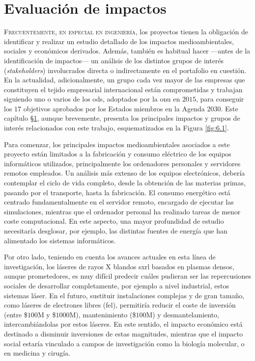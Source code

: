 \chapter{Evaluación de impactos}\label{cap:6}
\lettrine{F}{recuentemente, en especial en ingeniería}, los proyectos tienen la obligación de identificar y realizar un estudio detallado de los impactos medioambientales, sociales y económicos derivados. Además, también es habitual hacer ---antes de la identificación de impactos--- un análisis de los distintos grupos de interés (\emph{stakeholders}) involucrados directa o indirectamente en el portafolio en cuestión. En la actualidad, adicionalmente, un grupo cada vez mayor de las empresas que constituyen el tejido empresarial internacional están comprometidas y trabajan siguiendo uno o varios de los \acrfull{ods}, adoptados por la \acrfull{onu} en $2015$, para conseguir los $17$ objetivos aprobados por los Estados miembros en la Agenda $2030$. Este capítulo \S\ref{cap:6}, aunque brevemente, presenta los principales impactos y grupos de interés relacionados con este trabajo, esquematizados en la Figura \ref{fig:6.1}.

Para comenzar, los principales impactos medioambientales asociados a este proyecto están limitados a la fabricación y consumo eléctrico de los equipos informáticos utilizados, principalmente los ordenadores personales y servidores remotos empleados. Un análisis más extenso de los equipos electrónicos, debería contemplar el ciclo de vida completo, desde la obtención de las materias primas, pasando por el transporte, hasta la fabricación. El consumo energético está centrado fundamentalmente en el servidor remoto, encargado de ejecutar las simulaciones, mientras que el ordenador personal ha realizado tareas de menor coste computacional. En este aspecto, una mayor profundidad de estudio necesitaría desglosar, por ejemplo, las distintas fuentes de energía que han alimentado los sistemas informáticos.

Por otro lado, teniendo en cuenta los avances actuales en esta línea de investigación, los láseres de rayos X blandos \acrshort{sxrl} basados en plasmas densos, aunque prometedores, es muy difícil predecir cuáles pudieran ser las repercusiones sociales de desarrollar completamente, por ejemplo a nivel industrial, estos sistemas láser. En el futuro, sustituir instalaciones complejas y de gran tamaño, como láseres de electrones libres (\acrshort{fel}), permitiría reducir el coste de inversión (entre \$$100$M y \$$1000$M), mantenimiento (\$$100$M) y desmantelamiento, intercambiándolas por estos láseres. En este sentido, el impacto económico está destinado a disminuir inversiones de estas magnitudes, mientras que el impacto social estaría vinculado a campos de investigación como la biología molecular, o en medicina y cirugía.

